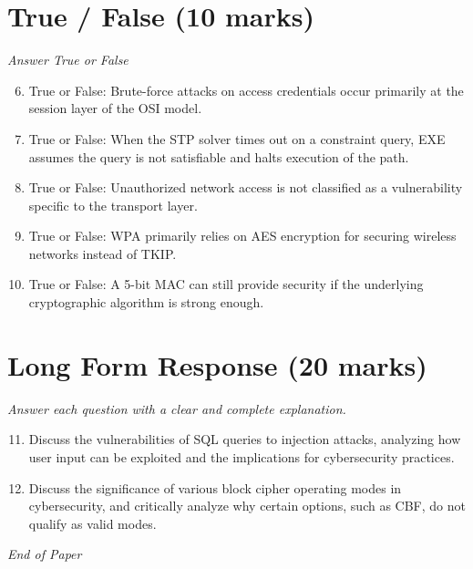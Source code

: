 \documentclass[12pt]{article}
\begin{document}
\section*{True / False (10 marks)}
\textit{Answer True or False}
\begin{enumerate}[label=\arabic*.]
\setcounter{enumi}{5}
\item True or False: Brute-force attacks on access credentials occur primarily at the session layer of the OSI model.
\item True or False: When the STP solver times out on a constraint query, EXE assumes the query is not satisfiable and halts execution of the path.
\item True or False: Unauthorized network access is not classified as a vulnerability specific to the transport layer.
\item True or False: WPA primarily relies on AES encryption for securing wireless networks instead of TKIP.
\item True or False: A 5-bit MAC can still provide security if the underlying cryptographic algorithm is strong enough.
\end{enumerate}

\section*{Long Form Response (20 marks)}
\textit{Answer each question with a clear and complete explanation.}
\begin{enumerate}[label=\arabic*.]
\setcounter{enumi}{10}
\item Discuss the vulnerabilities of SQL queries to injection attacks, analyzing how user input can be exploited and the implications for cybersecurity practices.
\item Discuss the significance of various block cipher operating modes in cybersecurity, and critically analyze why certain options, such as CBF, do not qualify as valid modes.
\end{enumerate}

\vfill
\noindent\textit{End of Paper}
\end{document}
